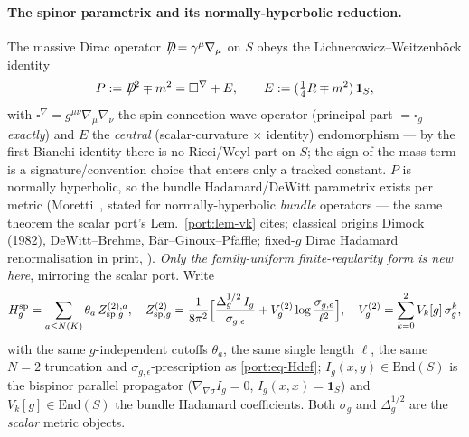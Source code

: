 \paragraph{The spinor parametrix and its normally-hyperbolic reduction.}
The massive Dirac operator $D\mkern-12mu/=\gamma^\mu\nabla_\mu$ on $S$ obeys the
Lichnerowicz--Weitzenb\"ock identity
\begin{equation}\label{dspin:eq-lich}
  P:=D\mkern-12mu/^2\mp m^2=\square^\nabla+E,\qquad
  E:=(\tfrac14 R\mp m^2)\,\mathbf 1_S,
\end{equation}
with $\square^\nabla=g^{\mu\nu}\nabla_\mu\nabla_\nu$ the spin-connection wave
operator (principal part $=\square_g$ \emph{exactly}) and $E$ the
\emph{central} (scalar-curvature $\times$ identity) endomorphism --- by the
first Bianchi identity there is no Ricci/Weyl part on $S$; the sign of the
mass term is a signature/convention choice that enters only a tracked constant.
$P$ is normally hyperbolic, so the bundle Hadamard/DeWitt parametrix exists
per metric (Moretti~\cite[Thm.~2.1]{Moretti2003}, stated for
normally-hyperbolic \emph{bundle} operators --- the same theorem the scalar
port's Lem.~\ref{port:lem-vk} cites; classical origins
Dimock (1982), DeWitt--Brehme, B\"ar--Ginoux--Pf\"affle; fixed-$g$
Dirac Hadamard renormalisation in print,
\cite{DappiaggiHackPinamonti2009}). \emph{Only the family-uniform
finite-regularity form is new here}, mirroring the scalar port. Write
\begin{equation}\label{dspin:eq-Hdef}
  H^{\mathrm{sp}}_g=\sum_{a\le N(K)}\theta_a\,Z^{(2),a}_{\mathrm{sp},g},\quad
  Z^{(2)}_{\mathrm{sp},g}=\frac1{8\pi^2}\Bigl[\frac{\Delta^{1/2}_g\,I_g}
  {\sigma_{g,\epsilon}}+V^{(2)}_g\log\frac{\sigma_{g,\epsilon}}{\ell^2}\Bigr],
  \quad V^{(2)}_g=\sum_{k=0}^2 V_k[g]\,\sigma_g^k,
\end{equation}
with the same $g$-independent cutoffs $\theta_a$, the same single length
$\ell$, the same $N=2$ truncation and $\sigma_{g,\epsilon}$-prescription as
\eqref{port:eq-Hdef}; $I_g(x,y)\in\mathrm{End}(S)$ is the bispinor parallel
propagator ($\nabla_{\nabla\sigma}I_g=0$, $I_g(x,x)=\mathbf 1_S$) and
$V_k[g]\in\mathrm{End}(S)$ the bundle Hadamard coefficients. Both $\sigma_g$
and $\Delta^{1/2}_g$ are the \emph{scalar} metric objects.

